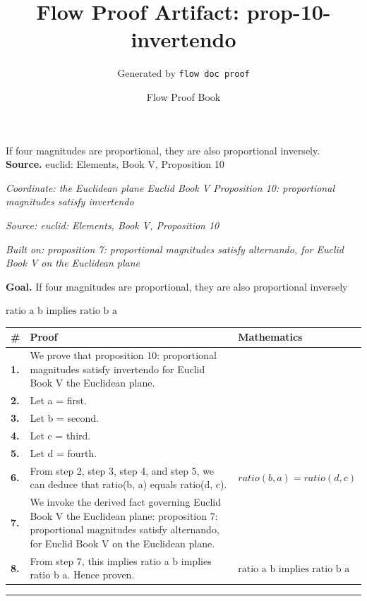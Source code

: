 \documentclass[11pt]{article}
\title{Flow Proof Artifact: prop-10-invertendo}
\author{Generated by \texttt{flow doc proof}}
\date{Flow Proof Book}
\theoremstyle{definition}
\begin{document}
\maketitle
If four magnitudes are proportional, they are also proportional inversely.\\[0.5em]
\textbf{Source.} euclid: Elements, Book V, Proposition 10\\[0.5em]
\bigskip
{}\par
\smallskip\noindent\textit{Coordinate: the Euclidean plane \cdot Euclid Book V \cdot Proposition 10: proportional magnitudes satisfy invertendo}\par
\smallskip\noindent\textit{Source: euclid: Elements, Book V, Proposition 10}\par
\smallskip\noindent\textit{Built on: proposition 7: proportional magnitudes satisfy alternando, for Euclid Book V on the Euclidean plane}\par
\medskip
\noindent\textbf{Goal.} If four magnitudes are proportional, they are also proportional inversely\par
\noindent$\displaystyle \text{ratio a b implies ratio b a}$\par
\medskip
\noindent
\begin{tabular}{@{} >{\raggedright\arraybackslash}p{} >{\raggedright\arraybackslash}p{} >{\raggedleft\arraybackslash}p{} @{}}
\textbf{\#} & \textbf{Proof} & \textbf{Mathematics} \\
\midrule
\textbf{1.} & We prove that proposition 10: proportional magnitudes satisfy invertendo for Euclid Book V the Euclidean plane. & \\[0.45em]
\textbf{2.} & Let a = first. & \\[0.45em]
\textbf{3.} & Let b = second. & \\[0.45em]
\textbf{4.} & Let c = third. & \\[0.45em]
\textbf{5.} & Let d = fourth. & \\[0.45em]
\textbf{6.} & From step 2, step 3, step 4, and step 5, we can deduce that ratio(b, a) equals ratio(d, c). & $\displaystyle ratio(b, a) = ratio(d, c)$ \\[0.45em]
\textbf{7.} & We invoke the derived fact governing Euclid Book V the Euclidean plane: proposition 7: proportional magnitudes satisfy alternando, for Euclid Book V on the Euclidean plane. & \\[0.45em]
\textbf{8.} & From step 7, this implies ratio a b implies ratio b a. Hence proven. & $\displaystyle \text{ratio a b implies ratio b a}$ \\[0.45em]
\bottomrule
\end{tabular}
\label{thm:Geometry-Euclid Book V-proposition_10_proportional_magnitudes_satisfy_invertendo}
\par\medskip\hrule
\end{document}
